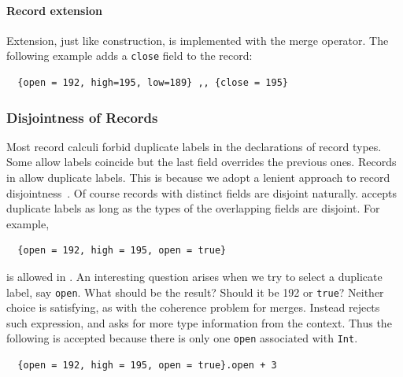 
\paragraph{Record extension} Extension, just like construction, is implemented
with the merge operator. The following example adds a \lstinline{close} field to
the record:
\begin{lstlisting}
  {open = 192, high=195, low=189} ,, {close = 195}
\end{lstlisting}

\subsubsection{Disjointness of Records}

Most record calculi forbid duplicate labels in the declarations of record types.
Some allow labels coincide but the last field overrides the previous ones.
Records in \name allow duplicate labels. This is because we adopt a lenient
approach to record disjointness~\cite{alpuimdisjoint}. Of course records with
distinct fields are disjoint naturally. \name accepts duplicate labels as long
as the types of the overlapping fields are disjoint. For example,
\begin{lstlisting}
  {open = 192, high = 195, open = true}
\end{lstlisting}
is allowed in \name. An interesting question arises when we try to select a
duplicate label, say \lstinline{open}. What should be the result? Should it be
192 or \lstinline{true}? Neither choice is satisfying, as with the coherence
problem for merges. Instead \name rejects such expression, and asks for more
type information from the context. Thus the following is accepted because there
is only one \lstinline{open} associated with \lstinline{Int}.
\begin{lstlisting}
  {open = 192, high = 195, open = true}.open + 3
\end{lstlisting}

